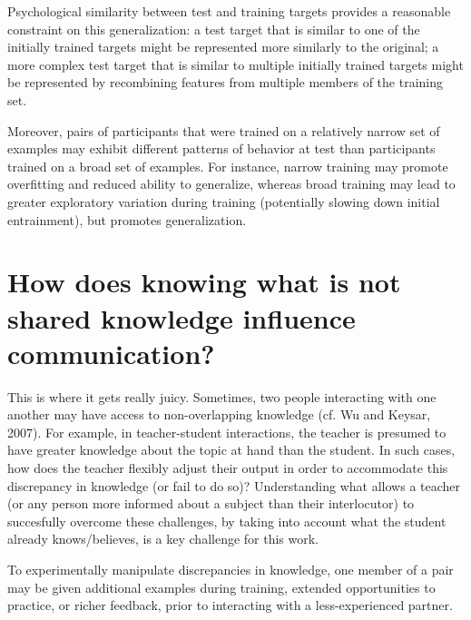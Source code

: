 \documentclass[12pt]{article}
\begin{document}
Psychological similarity between test and training targets provides a reasonable constraint on this generalization: a test target that is similar to one of the initially trained targets might be represented more similarly to the original; a more complex test target that is similar to multiple initially trained targets might be represented by recombining features from multiple members of the training set. 

Moreover, pairs of participants that were trained on a relatively narrow set of examples may exhibit different patterns of behavior at test than participants trained on a broad set of examples. For instance, narrow training may promote overfitting and reduced ability to generalize, whereas broad training may lead to greater exploratory variation during training (potentially slowing down initial entrainment), but promotes generalization. 

\section{How does knowing what is not shared knowledge influence communication? }

This is where it gets really juicy. Sometimes, two people interacting with one another may have access to non-overlapping knowledge (cf. Wu and Keysar, 2007). For example, in teacher-student interactions, the teacher is presumed to have greater knowledge about the topic at hand than the student. In such cases, how does the teacher flexibly adjust their output in order to accommodate this discrepancy in knowledge (or fail to do so)? Understanding what allows a teacher (or any person more informed about a subject than their interlocutor) to succesfully overcome these challenges, by taking into account what the student already knows/believes, is a key challenge for this work. 

To experimentally manipulate discrepancies in knowledge, one member of a pair may be given additional examples during training, extended opportunities to practice, or richer feedback, prior to interacting with a less-experienced partner. 
\end{document}
